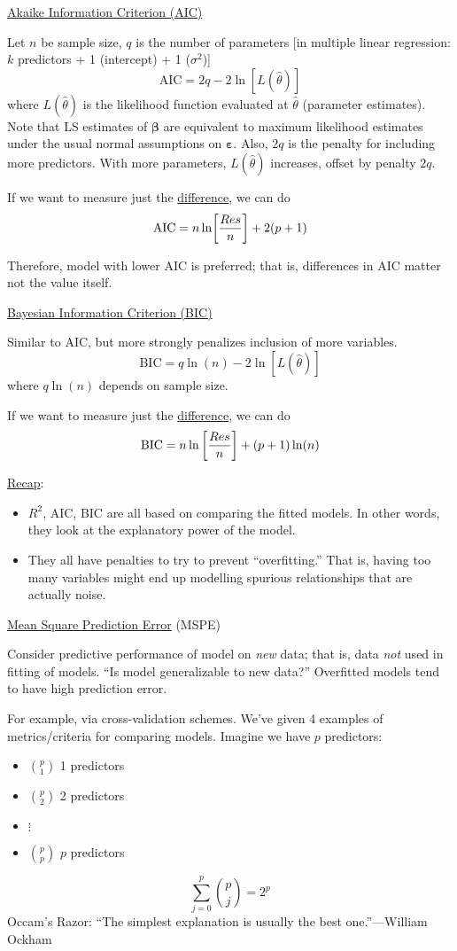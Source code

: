 \underline{Akaike Information Criterion (AIC)}

Let $ n $ be sample size, $ q $ is the number of parameters
      [in multiple linear regression: $ k $ predictors + 1 (intercept) + 1 ($ \sigma^2 $)]
\[ \text{AIC}=2q-2\ln[L(\hat{\theta})] \]
where $ L(\hat{\theta}) $ is the likelihood function evaluated
at $ \hat{\theta} $ (parameter estimates). Note that
LS estimates of $ \symbf{\beta} $ are equivalent to maximum
likelihood estimates
under the usual normal assumptions on $ \symbf{\varepsilon} $.
Also, $ 2q $ is the penalty for including more predictors.
With more parameters, $ L(\hat{\theta}) $
increases, offset by penalty $ 2q $.

If we want to measure
just the \underline{difference}, we can do
\[ \text{AIC}=n\ln \biggl[\frac{\relax{Res}}{n}\biggr]+2(p+1) \]


Therefore, model with lower AIC is preferred; that is,
differences in AIC matter not the value itself.

\underline{Bayesian Information Criterion (BIC)}

Similar to AIC, but more strongly penalizes
inclusion of more variables.
\[ \text{BIC}=q\ln(n)-2\ln[L(\hat{\theta})] \]
where $ q\ln(n) $ depends on sample size.

If we want to measure
just the \underline{difference}, we can do
\[ \text{BIC}=n\ln\left[ \frac{\relax{Res}}{n} \right]+(p+1)\ln(n) \]

\underline{Recap}:
\begin{itemize}
      \item $ R^2 $, AIC, BIC
            are all based on comparing the fitted models.
            In other words, they look at the explanatory power of
            the model.
      \item They all have penalties to try to prevent
            ``overfitting.'' That is, having too many
            variables might end up modelling
            spurious relationships that are actually
            noise.
\end{itemize}

\underline{Mean Square Prediction Error} (MSPE)

Consider predictive performance of model on \emph{new}
data; that is, data \emph{not} used in fitting
of models. ``Is model generalizable to new data?''
Overfitted models tend to have high prediction error.

For example, via cross-validation schemes.
We've given 4 examples of metrics/criteria for comparing
models. Imagine we have $ p $ predictors:
\begin{itemize}
      \item $ \binom{p}{1} $ 1 predictors
      \item $ \binom{p}{2} $ 2 predictors
      \item $ \vdots $
      \item $ \binom{p}{p} $ $ p $ predictors
\end{itemize}
\[ \sum_{j=0}^{p}\binom{p}{j}=2^p \]
Occam's Razor: ``The simplest explanation is
usually the best one.''---William Ockham

